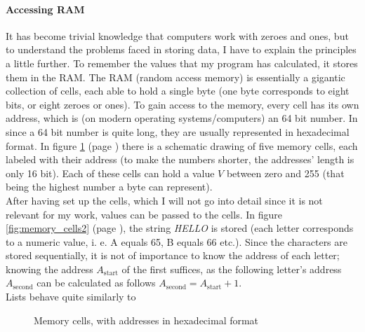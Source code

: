 \documentclass[10pt,a4paper,titlepage]{article}
\begin{document}
	\paragraph{Accessing RAM}
	It has become trivial knowledge that computers work with zeroes and ones, but to understand the problems faced in storing data, I have to explain the principles a little further. To remember the values that my program has calculated, it stores them in the RAM. The RAM (random access memory) is essentially a gigantic collection of cells, each able to hold a single byte (one byte corresponds to eight bits, or eight zeroes or ones). To gain access to the memory, every cell has its own address, which is (on modern operating systems/computers) an 64 bit number. In since a 64 bit number is quite long, they are usually represented in hexadecimal format. In figure \ref{fig:memory_cells1} (page \pageref{fig:memory_cells1}) there is a schematic drawing of five memory cells, each labeled with their address (to make the numbers shorter, the addresses' length is only 16 bit). Each of these cells can hold a value $V$ between zero and 255 (that being the highest number a byte can represent).\\
	After having set up the cells, which I will not go into detail since it is not relevant for my work, values can be passed to the cells. In figure \ref{fig:memory_cells2} (page \pageref{fig:memory_cells2}), the string \emph{HELLO} is stored (each letter corresponds to a numeric value, i. e. A equals 65, B equals 66 etc.). Since the characters are stored sequentially, it is not of importance to know the address of each letter; knowing the address $A_{\text{start}}$ of the first suffices, as the following letter's address $A_{\text{second}}$ can be calculated as follows $A_{\text{second}} = A_{\text{start}} + 1$.\\
	Lists behave quite similarly to 
	\cite{howstuffworks}
	\begin{figure}
		\centering
		\caption{Memory cells, with addresses in hexadecimal format}
		\label{fig:memory_cells1}
	\end{figure}
\end{document}
